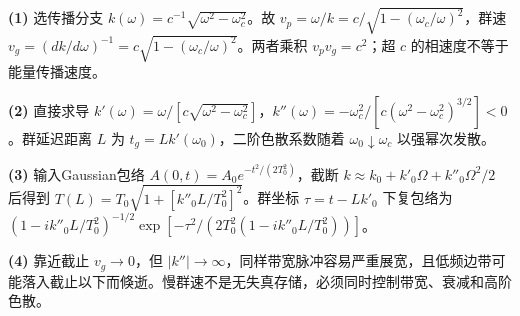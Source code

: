 \par\noindent\textbf{(1)} 选传播分支 \(k(\omega)=c^{-1}\sqrt{\omega^2-\omega_c^2}\)。故 \(v_p=\omega/k=c/\sqrt{1-(\omega_c/\omega)^2}\)，群速 \(v_g=(dk/d\omega)^{-1}=c\sqrt{1-(\omega_c/\omega)^2}\)。两者乘积 \(v_pv_g=c^2\)；超 \(c\) 的相速度不等于能量传播速度。
\par\noindent\textbf{(2)} 直接求导 \(k'(\omega)=\omega/[c\sqrt{\omega^2-\omega_c^2}]\)，\(k''(\omega)=-\omega_c^2/[c(\omega^2-\omega_c^2)^{3/2}]<0\)。群延迟距离 \(L\) 为 \(t_g=Lk'(\omega_0)\)，二阶色散系数随着 \(\omega_0\downarrow\omega_c\) 以强幂次发散。
\par\noindent\textbf{(3)} 输入Gaussian包络 \(A(0,t)=A_0e^{-t^2/(2T_0^2)}\)，截断 \(k\approx k_0+k'_0\Omega+k''_0\Omega^2/2\) 后得到 \(T(L)=T_0\sqrt{1+[k''_0L/T_0^2]^2}\)。群坐标 \(\tau=t-Lk'_0\) 下复包络为 \((1-ik''_0L/T_0^2)^{-1/2}\exp[-\tau^2/(2T_0^2(1-ik''_0L/T_0^2))]\)。
\par\noindent\textbf{(4)} 靠近截止 \(v_g\to0\)，但 \(|k''|\to\infty\)，同样带宽脉冲容易严重展宽，且低频边带可能落入截止以下而倏逝。慢群速不是无失真存储，必须同时控制带宽、衰减和高阶色散。
